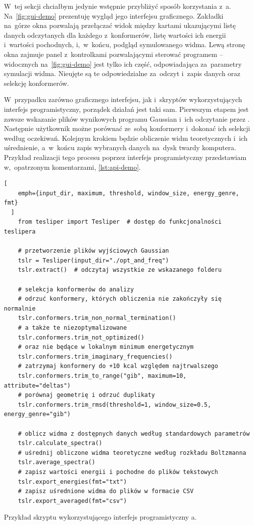 W~tej sekcji chciałbym jedynie wstępnie przybliżyć sposób korzystania z~\tesliper{}a.
Na~\cref{fig:gui-demo} prezentuję wygląd jego interfejsu graficznego.
Zakładki na~górze okna pozwalają przełączać widok między kartami ukazującymi listę danych
  odczytanych dla każdego z~konformerów, listę wartości ich energii i~wartości pochodnych,
  i,~w~końcu, podgląd symulowanego widma.
Lewą stronę okna zajmuje panel z~kontrolkami pozwalającymi sterować programem \--- widocznych
  na~\cref{fig:gui-demo} jest tylko ich część, odpowiadająca za~parametry symulacji widma.
Nieujęte są te odpowiedzialne za~odczyt i~zapis danych oraz selekcję konformerów.

W~przypadku zarówno graficznego interfejsu, jak i~skryptów wykorzystujących interfejs
  programistyczny, porządek działań jest taki sam.
Pierwszym etapem jest zawsze wskazanie plików wynikowych programu Gaussian i~ich odczytanie
  przez \tesliper{}.
Następnie użytkownik możne porównać ze~sobą konformery i~dokonać ich selekcji według oczekiwań.
Kolejnym krokiem będzie obliczenie widm teoretycznych i~ich uśrednienie, a~w~końcu zapis
  wybranych danych na~dysk twardy komputera.
Przykład realizacji tego procesu poprzez interfejs programistyczny przedstawiam
  w,~opatrzonym komentarzami, \cref{lst:api-demo}.

\begin{listing*}
  \begin{lstlisting}[
    emph={input_dir, maximum, threshold, window_size, energy_genre, fmt}
  ]
    from tesliper import Tesliper  # dostęp do funkcjonalności teslipera
    
    # przetworzenie plików wyjściowych Gaussian
    tslr = Tesliper(input_dir="./opt_and_freq")
    tslr.extract()  # odczytaj wszystkie ze wskazanego folderu
    
    # selekcja konformerów do analizy
    # odrzuć konformery, których obliczenia nie zakończyły się normalnie
    tslr.conformers.trim_non_normal_termination()
    # a także te niezoptymalizowane
    tslr.conformers.trim_not_optimized()
    # oraz nie będące w lokalnym minimum energetycznym
    tslr.conformers.trim_imaginary_frequencies()
    # zatrzymaj konformery do +10 kcal względem najtrwalszego
    tslr.conformers.trim_to_range("gib", maximum=10, attribute="deltas")
    # porównaj geometrię i odrzuć duplikaty
    tslr.conformers.trim_rmsd(threshold=1, window_size=0.5, energy_genre="gib")
    
    # oblicz widma z dostępnych danych według standardowych parametrów
    tslr.calculate_spectra()
    # uśrednij obliczone widma teoretyczne według rozkładu Boltzmanna
    tslr.average_spectra()
    # zapisz wartości energii i pochodne do plików tekstowych
    tslr.export_energies(fmt="txt")
    # zapisz uśrednione widma do plików w formacie CSV
    tslr.export_averaged(fmt="csv")
  \end{lstlisting}
  \caption{Przykład skryptu wykorzystującego interfejs programistyczny \tesliper{}a.}
  \label{lst:api-demo}
\end{listing*}

